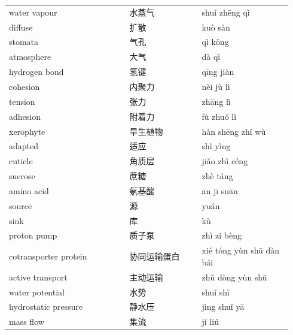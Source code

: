 \documentclass[11pt]{article}
\begin{document}
\begin{longtable}{@{}p{0.40\linewidth}p{0.24\linewidth}p{0.30\linewidth}@{}}
water vapour & 水蒸气 & shuǐ zhēng qì \\
diffuse & 扩散 & kuò sàn \\
stomata & 气孔 & qì kǒng \\
atmosphere & 大气 & dà qì \\
hydrogen bond & 氢键 & qīng jiàn \\
cohesion & 内聚力 & nèi jù lì \\
tension & 张力 & zhāng lì \\
adhesion & 附着力 & fù zhuó lì \\
xerophyte & 旱生植物 & hàn shēng zhí wù \\
adapted & 适应 & shì yìng \\
cuticle & 角质层 & jiǎo zhì céng \\
sucrose & 蔗糖 & zhè táng \\
amino acid & 氨基酸 & ān jī suān \\
source & 源 & yuán \\
sink & 库 & kù \\
proton pump & 质子泵 & zhì zi bèng \\
cotransporter protein & 协同运输蛋白 & xié tóng yùn shū dàn bái \\
active transport & 主动运输 & zhǔ dòng yùn shū \\
water potential & 水势 & shuǐ shì \\
hydrostatic pressure & 静水压 & jìng shuǐ yā \\
mass flow & 集流 & jí liú \\
\end{longtable}
\end{document}
